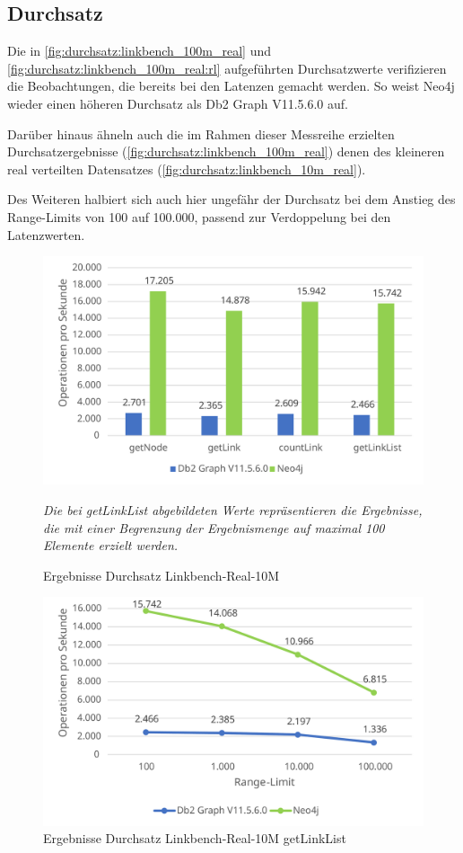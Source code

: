 \subsection{Durchsatz}
Die in \autoref{fig:durchsatz:linkbench_100m_real} und \autoref{fig:durchsatz:linkbench_100m_real:rl} aufgeführten Durchsatzwerte verifizieren die Beobachtungen, die bereits bei den Latenzen gemacht werden. So weist Neo4j wieder einen höheren Durchsatz als Db2 Graph V11.5.6.0 auf.

Darüber hinaus ähneln auch die im Rahmen dieser Messreihe erzielten Durchsatzergebnisse (\autoref{fig:durchsatz:linkbench_100m_real}) denen des kleineren real verteilten Datensatzes (\autoref{fig:durchsatz:linkbench_10m_real}).

Des Weiteren halbiert sich auch hier ungefähr der Durchsatz bei dem Anstieg des Range-Limits von 100 auf 100.000, passend zur Verdoppelung bei den Latenzwerten.

\begin{figure}[!ht]
    \centering
    \includegraphics[width=\textwidth]{images/diagramme/linkbench_100m_real_durchsatz.pdf}
    \caption{Ergebnisse Durchsatz Linkbench-Real-10M}
    \label{fig:durchsatz:linkbench_100m_real}
    \vspace{1em}
    \textit{Die bei getLinkList abgebildeten Werte repräsentieren die Ergebnisse, die mit einer Begrenzung der Ergebnismenge auf maximal 100 Elemente erzielt werden.}
\end{figure}

\begin{figure}[!ht]
    \centering
    \includegraphics[width=\textwidth]{images/diagramme/limit_absolute_durchsatz_real_100m.pdf}
    \caption{Ergebnisse Durchsatz Linkbench-Real-10M getLinkList}
    \label{fig:durchsatz:linkbench_100m_real:rl}
\end{figure}